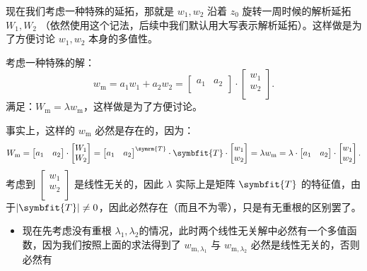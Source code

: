 \begin{tcolorbox}[colback=gray!20,colframe=gray!150,fonttitle=\bfseries,arc=0mm,leftrule=1mm,toprule=0mm,bottomrule=0mm,rightrule=0mm,breakable]
	现在我们考虑一种特殊的延拓，那就是 \(w_1,w_2\) 沿着 \(z_0\) 旋转一周时候的解析延拓 \(W_1,W_2\) （依然使用这个记法，后续中我们默认用大写表示解析延拓）。这样做是为了方便讨论 \(w_1,w_2\) 本身的多值性。

	考虑一种特殊的解：
	\[
		w_{\mathrm{m} }= a_1 w_1 +a_2w_2 = \begin{bmatrix}
			a_1 & a_2 \\
		\end{bmatrix}\cdot \begin{bmatrix}
			w_1 \\    w_2 \\\end{bmatrix}
		.\]
	满足：\(W_{\mathrm{m} } = \lambda w_{\mathrm{m}}\)，这样做是为了方便讨论。

	事实上，这样的 \(w_{\mathrm{m}}\) 必然是存在的，因为：
	\[
		W_{\mathrm{m}} =  \begin{bmatrix}
			a_1 & a_2 \\
		\end{bmatrix}\cdot \begin{bmatrix}
			W_1 \\    W_2 \\\end{bmatrix} =  \begin{bmatrix}
			a_1 & a_2 \\
		\end{bmatrix}^{\symrm{T}}\cdot  \symbfit{T} \cdot \begin{bmatrix}
			w_1 \\    w_2 \\\end{bmatrix}= \lambda w_{\mathrm{m}} =\lambda \cdot  \begin{bmatrix}
			a_1 & a_2 \\
		\end{bmatrix}\cdot \begin{bmatrix}
			w_1 \\    w_2 \\\end{bmatrix}
		.\]
	考虑到 \(\begin{bmatrix}
		w_1 \\    w_2 \\\end{bmatrix}\) 是线性无关的，因此 \(\lambda \) 实际上是矩阵 \(\symbfit{T} \) 的特征值，由于\(\left\vert\symbfit{T}  \right\vert \neq 0\)，因此必然存在（而且不为零），只是有无重根的区别罢了。
	\begin{itemize}\kaiti
		\item 现在先考虑没有重根 \(\lambda_1,\lambda _2\)的情况，此时两个线性无关解中必然有一个多值函数，因为我们按照上面的求法得到了 \(w_{\mathrm m,\lambda_1}\) 与 \(w_{\mathrm m,\lambda _2}\) 必然是线性无关的，否则必然有

\end{itemize}
\end{tcolorbox}
